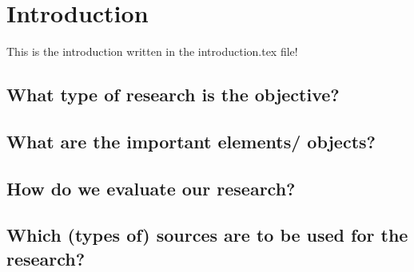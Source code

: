 \section{Introduction}
This is the introduction written in the introduction.tex file!

\subsection{What type of research is the objective?}

\subsection{What are the important elements/ objects?}

\subsection{How do we evaluate our research?}

\subsection{Which (types of) sources are to be used for the research?}